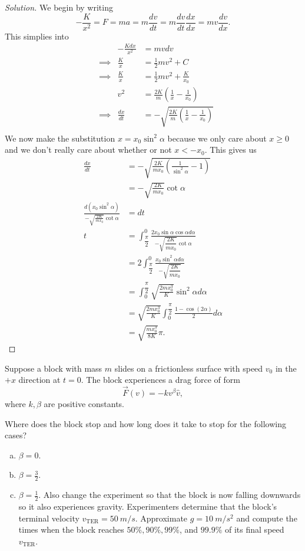 \documentclass{article}
\begin{document}
\begin{proof}[Solution]
We begin by writing
\[ -\frac{K}{x^2} = F = ma = m \frac{dv}{dt} = m \frac{dv}{dt}
\frac{dx}{dx} = m v \frac{dv}{dx}. \]
This simplies into
\[ \begin{aligned}
&& -\frac{Kdx}{x^2} &= mvdv \\
&\implies& \frac{K}{x} &= \frac{1}{2}mv^2 + C \\
&\implies& \frac{K}{x} &= \frac{1}{2}mv^2 + \frac{K}{x_0} \\
&& v^2 &= \frac{2K}{m}\left(\frac{1}{x} - \frac{1}{x_0}\right) \\
&\implies& \frac{dx}{dt} &= -\sqrt{\frac{2K}{m}\left(\frac{1}{x} -
\frac{1}{x_0}\right)} \\
\end{aligned} \]
We now make the substitution $x = x_0 \sin^2 \alpha$ because we only
care about $x \geq 0$ and we don't really care about whether or not $x <
-x_0$. This gives us
\[ \begin{aligned}
\frac{dx}{dt} &= -\sqrt{\frac{2K}{m x_0} \left( \frac{1}{\sin^2 \alpha}
- 1 \right)} \\
&= -\sqrt{\frac{2K}{mx_0}} \cot \alpha \\
\frac{d(x_0 \sin^2 \alpha)}{- \sqrt{\frac{2K}{mx_0}} \cot \alpha} &= dt
\\
t &= \int_{\dfrac{\pi}{2}}^0 \frac{2 x_0 \sin \alpha \cos \alpha d
\alpha}{-\sqrt{\dfrac{2K}{mx_0}} \cot \alpha} \\
&= 2 \int_{\dfrac{\pi}{2}}^0 \frac{x_0 \sin^2 \alpha d \alpha}{-\sqrt{
\dfrac{2K}{mx_0}}} \\
&= \int_0^{\dfrac{\pi}{2}} \sqrt{\frac{2mx_0^3}{K}} \sin^2 \alpha d
\alpha \\
&= \sqrt{\frac{2mx_0^3}{K}} \int_0^{\dfrac{\pi}{2}} \frac{1 - \cos(2
\alpha)}{2} d \alpha \\
&= \boxed{\sqrt{\frac{mx_0^3}{8K}} \pi}.
\end{aligned} \]
\end{proof}

\begin{prb}
Suppose a block with mass $m$ slides on a frictionless surface with
speed $v_0$ in the $+x$ direction at $t = 0$. The block experiences a
drag force of form
\[ \vec{F}(v) = -k v^\beta \hat{v}, \]
where $k, \beta$ are positive constants.

Where does the block stop and how long does it take to stop for the
following cases?
\begin{enumerate}[(a)]
\item $\beta = 0$.
\item $\beta = \frac{3}{2}$.
\item $\beta = \frac{1}{2}$. Also change the experiment so that the
block is now falling downwards so it also experiences gravity.
Experimenters determine that the block's terminal velocity
$v_{\textrm{TER}} = \SI{50}{m/s}$. Approximate $g = \SI{10}{m/s^2}$ and
compute the times when the block reaches $50\%, 90\%, 99\%$, and
$99.9\%$ of its final speed $v_{\textrm{TER}}$.
\end{enumerate}
\end{prb}
\end{document}
